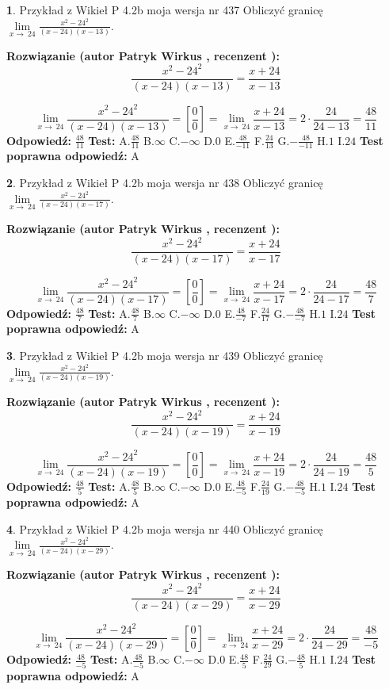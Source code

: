 \documentclass[12pt, a4paper]{article}
\theoremstyle{definition} %
\newtheorem{zad}{}
\newcommand{\zadStart}[1]{\begin{zad}#1\newline}
\newcommand{\zadStop}{\end{zad}}
\newcommand{\rozwStart}[2]{\noindent \textbf{Rozwiązanie (autor #1 , recenzent #2): }\newline}
\newcommand{\rozwStop}{\newline}
\newcommand{\odpStart}{\noindent \textbf{Odpowiedź:}\newline}
\newcommand{\odpStop}{\newline}
\newcommand{\testStart}{\noindent \textbf{Test:}\newline}
\newcommand{\testStop}{\newline}
\newcommand{\kluczStart}{\noindent \textbf{Test poprawna odpowiedź:}\newline}
\newcommand{\kluczStop}{\newline}
\begin{document}
\zadStart{Przykład z Wikieł P 4.2b moja wersja nr 437}
Obliczyć granicę $\lim\limits_{x\to\ 24}\frac{x^{2}-24^{2}}{(x-24)(x-13)}$.
\zadStop
\rozwStart{Patryk Wirkus}{}
$$\frac{x^{2}-24^{2}}{(x-24)(x-13)}=\frac{x+24}{x-13}$$

$$\lim\limits_{x\to\ 24}\frac{x^{2}-24^{2}}{(x-24)(x-13)}=[\frac{0}{0}]=\lim\limits_{x\to\ 24}\frac{x+24}{x-13}=2 \cdot \frac{24}{24-13} = \frac{48}{11}$$
\rozwStop
\odpStart
$\frac{48}{11}$
\odpStop
\testStart
A.$\frac{48}{11}$
B.$\infty$
C.$-\infty$
D.$0$
E.$\frac{48}{-11}$
F.$\frac{24}{13}$
G.$-\frac{48}{-11}$
H.$1$
I.$24$
\testStop
\kluczStart
A
\kluczStop



\zadStart{Przykład z Wikieł P 4.2b moja wersja nr 438}
Obliczyć granicę $\lim\limits_{x\to\ 24}\frac{x^{2}-24^{2}}{(x-24)(x-17)}$.
\zadStop
\rozwStart{Patryk Wirkus}{}
$$\frac{x^{2}-24^{2}}{(x-24)(x-17)}=\frac{x+24}{x-17}$$

$$\lim\limits_{x\to\ 24}\frac{x^{2}-24^{2}}{(x-24)(x-17)}=[\frac{0}{0}]=\lim\limits_{x\to\ 24}\frac{x+24}{x-17}=2 \cdot \frac{24}{24-17} = \frac{48}{7}$$
\rozwStop
\odpStart
$\frac{48}{7}$
\odpStop
\testStart
A.$\frac{48}{7}$
B.$\infty$
C.$-\infty$
D.$0$
E.$\frac{48}{-7}$
F.$\frac{24}{17}$
G.$-\frac{48}{-7}$
H.$1$
I.$24$
\testStop
\kluczStart
A
\kluczStop



\zadStart{Przykład z Wikieł P 4.2b moja wersja nr 439}
Obliczyć granicę $\lim\limits_{x\to\ 24}\frac{x^{2}-24^{2}}{(x-24)(x-19)}$.
\zadStop
\rozwStart{Patryk Wirkus}{}
$$\frac{x^{2}-24^{2}}{(x-24)(x-19)}=\frac{x+24}{x-19}$$

$$\lim\limits_{x\to\ 24}\frac{x^{2}-24^{2}}{(x-24)(x-19)}=[\frac{0}{0}]=\lim\limits_{x\to\ 24}\frac{x+24}{x-19}=2 \cdot \frac{24}{24-19} = \frac{48}{5}$$
\rozwStop
\odpStart
$\frac{48}{5}$
\odpStop
\testStart
A.$\frac{48}{5}$
B.$\infty$
C.$-\infty$
D.$0$
E.$\frac{48}{-5}$
F.$\frac{24}{19}$
G.$-\frac{48}{-5}$
H.$1$
I.$24$
\testStop
\kluczStart
A
\kluczStop



\zadStart{Przykład z Wikieł P 4.2b moja wersja nr 440}
Obliczyć granicę $\lim\limits_{x\to\ 24}\frac{x^{2}-24^{2}}{(x-24)(x-29)}$.
\zadStop
\rozwStart{Patryk Wirkus}{}
$$\frac{x^{2}-24^{2}}{(x-24)(x-29)}=\frac{x+24}{x-29}$$

$$\lim\limits_{x\to\ 24}\frac{x^{2}-24^{2}}{(x-24)(x-29)}=[\frac{0}{0}]=\lim\limits_{x\to\ 24}\frac{x+24}{x-29}=2 \cdot \frac{24}{24-29} = \frac{48}{-5}$$
\rozwStop
\odpStart
$\frac{48}{-5}$
\odpStop
\testStart
A.$\frac{48}{-5}$
B.$\infty$
C.$-\infty$
D.$0$
E.$\frac{48}{5}$
F.$\frac{24}{29}$
G.$-\frac{48}{5}$
H.$1$
I.$24$
\testStop
\kluczStart
A
\kluczStop
\end{document}
